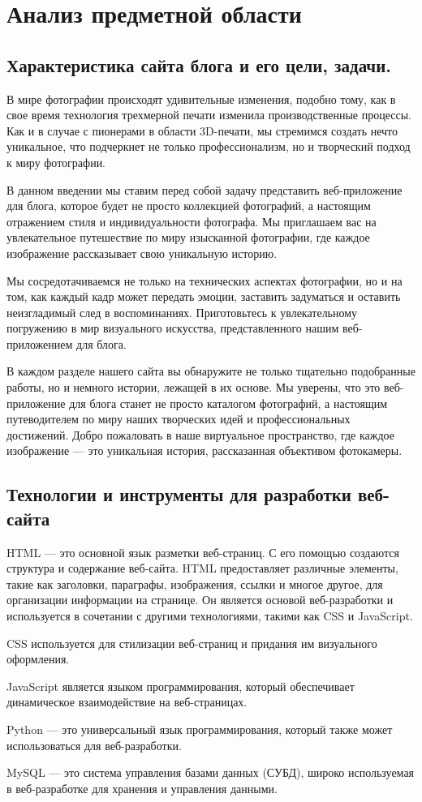 \section{Анализ предметной области}
\subsection{Характеристика сайта блога и его цели, задачи.}

В мире фотографии происходят удивительные изменения, подобно тому, как в свое время технология трехмерной печати изменила производственные процессы. Как и в случае с пионерами в области 3D-печати, мы стремимся создать нечто уникальное, что подчеркнет не только профессионализм, но и творческий подход к миру фотографии.

В данном введении мы ставим перед собой задачу представить веб-приложение для блога, которое будет не просто коллекцией фотографий, а настоящим отражением стиля и индивидуальности фотографа. Мы приглашаем вас на увлекательное путешествие по миру изысканной фотографии, где каждое изображение рассказывает свою уникальную историю.

Мы сосредотачиваемся не только на технических аспектах фотографии, но и на том, как каждый кадр может передать эмоции, заставить задуматься и оставить неизгладимый след в воспоминаниях. Приготовьтесь к увлекательному погружению в мир визуального искусства, представленного нашим веб-приложением для блога.

В каждом разделе нашего сайта вы обнаружите не только тщательно подобранные работы, но и немного истории, лежащей в их основе. Мы уверены, что это веб-приложение для блога станет не просто каталогом фотографий, а настоящим путеводителем по миру наших творческих идей и профессиональных достижений. Добро пожаловать в наше виртуальное пространство, где каждое изображение — это уникальная история, рассказанная объективом фотокамеры.
\subsection{Технологии и инструменты для разработки веб-сайта}

HTML — это основной язык разметки веб-страниц. С его помощью создаются структура и содержание веб-сайта. HTML предоставляет различные элементы, такие как заголовки, параграфы, изображения, ссылки и многое другое, для организации информации на странице. Он является основой веб-разработки и используется в сочетании с другими технологиями, такими как CSS и JavaScript.

CSS используется для стилизации веб-страниц и придания им визуального оформления.

JavaScript является языком программирования, который обеспечивает динамическое взаимодействие на веб-страницах. 

Python — это универсальный язык программирования, который также может использоваться для веб-разработки.

MySQL — это система управления базами данных (СУБД), широко используемая в веб-разработке для хранения и управления данными.